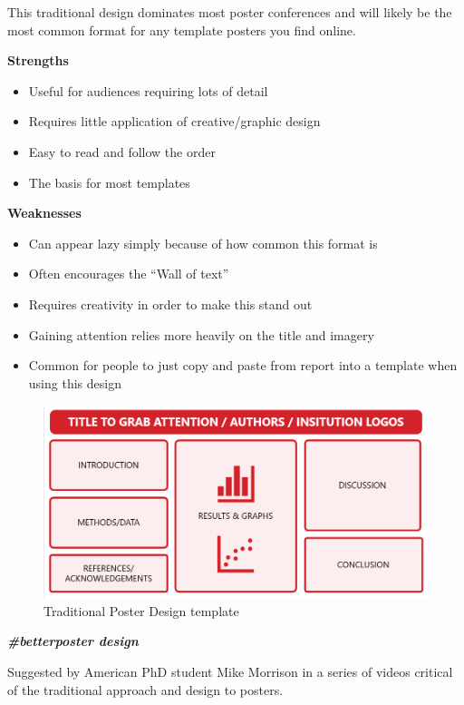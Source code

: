 \documentclass[
]{book}
\providecommand{\tightlist}{%
  \setlength{\itemsep}{0pt}\setlength{\parskip}{0pt}}
\begin{document}
This traditional design dominates most poster conferences and will likely be the most common format for any template posters you find online.

\textbf{Strengths}

\begin{itemize}
\tightlist
\item
  Useful for audiences requiring lots of detail
\item
  Requires little application of creative/graphic design
\item
  Easy to read and follow the order
\item
  The basis for most templates
\end{itemize}

\textbf{Weaknesses}

\begin{itemize}
\tightlist
\item
  Can appear lazy simply because of how common this format is
\item
  Often encourages the ``Wall of text''
\item
  Requires creativity in order to make this stand out
\item
  Gaining attention relies more heavily on the title and imagery
\item
  Common for people to just copy and paste from report into a template when using this design
\end{itemize}

\begin{figure}
\centering
\includegraphics{img/Traditional Poster design template.png}
\caption{Traditional Poster Design template}
\end{figure}

\textbf{\emph{\#betterposter design}}

Suggested by American PhD student Mike Morrison in a series of videos critical of the traditional approach and design to posters.
\end{document}
